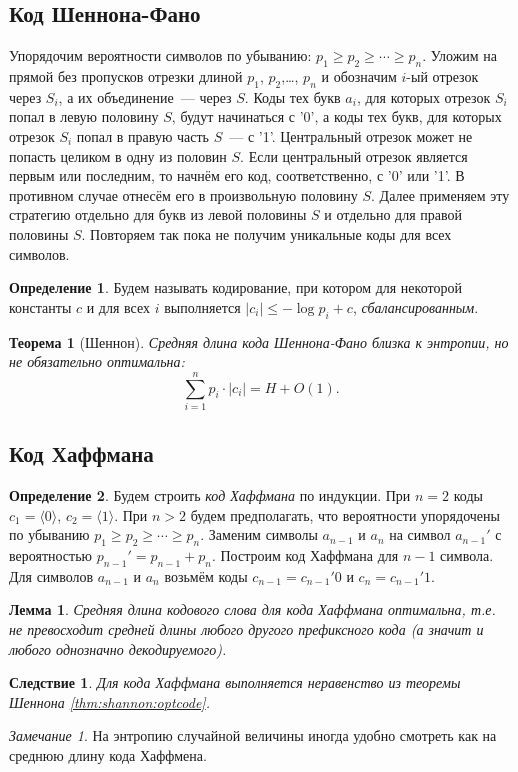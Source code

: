 \documentclass[12pt]{article}
\theoremstyle{definition}
\newtheorem{definition}{Определение}[section]
\theoremstyle{plain}
\newtheorem{theorem}{Теорема}[section]
\newtheorem{lemma}{Лемма}[section]
\newtheorem{corollary}{Следствие}[section]
\theoremstyle{remark}
\newtheorem{remark}{Замечание}[section]
\begin{document}
\subsection{Код Шеннона-Фано}
Упорядочим вероятности символов по убыванию: $p_1\ge p_2\ge\dotsb\ge p_n$.
Уложим на прямой без пропусков отрезки длиной $p_1$, $p_2$,\ldots, $p_n$
и обозначим $i$-ый отрезок через $S_i$, а их объединение~--- через $S$.
Коды тех букв $a_i$, для которых отрезок $S_i$ попал в левую половину $S$,
будут начинаться с '0', а коды тех букв, для которых отрезок $S_i$ попал
в правую часть $S$~--- с '1'. Центральный отрезок может не попасть
целиком в одну из половин $S$. Если центральный отрезок является первым
или последним, то начнём его код, соответственно, с '0' или '1'.
В противном случае отнесём его в произвольную половину $S$. Далее
применяем эту стратегию отдельно для букв из левой половины $S$ и отдельно для
правой половины $S$. Повторяем так пока не получим уникальные коды для всех
символов.     

\begin{definition}
    Будем называть кодирование, при котором для некоторой константы $c$ и для
    всех $i$ выполняется $|c_i|\le - \log p_i + c$, \emph{сбалансированным}.
\end{definition}

\begin{theorem}[Шеннон]
    Средняя длина кода Шеннона-Фано близка к энтропии, но не обязательно
    оптимальна:
    \[
        \sum_{i=1}^n p_i\cdot |c_i| = H + O(1). 
    \]
\end{theorem}
\subsection{Код Хаффмана}
\begin{definition}
    Будем строить \emph{код Хаффмана} по индукции. При $n = 2$ коды $c_1 =
    \langle0\rangle$, $c_2 = \langle1\rangle$. При $n > 2$ будем предполагать,
    что вероятности упорядочены по убыванию $p_1\ge p_2\ge\dotsb\ge p_n$.
    Заменим символы $a_{n-1}$ и $a_n$ на символ $a_{n-1}'$ с вероятностью
    $p_{n-1}' = p_{n-1} + p_n$. Построим код Хаффмана для $n-1$ символа.
    Для символов $a_{n-1}$ и $a_n$ возьмём коды $c_{n-1} = c_{n-1}'0$ и
    $c_{n} = c_{n-1}'1$.
\end{definition}
\begin{lemma}
    Средняя длина кодового слова для кода Хаффмана оптимальна, т.е. не превосходит средней длины
    любого другого префиксного кода (а значит и любого однозначно
    декодируемого).    
\end{lemma}
\begin{corollary}
    Для кода Хаффмана выполняется неравенство из теоремы Шеннона \ref{thm:shannon:optcode}.
\end{corollary}
\begin{remark}
    На энтропию случайной величины иногда удобно смотреть как на среднюю длину
    кода Хаффмена.
\end{remark}
\end{document}
